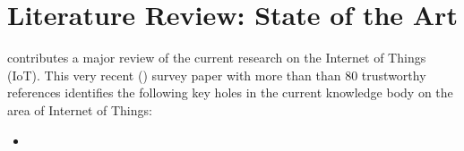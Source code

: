 \section{Literature Review: State of the Art}

\textcite{xu-he-li:internet-of-things-in-industries-a-survery:2014} contributes a major review of the current research on the Internet of Things (IoT). This very recent (\citeyear{xu-he-li:internet-of-things-in-industries-a-survery:2014}) survey paper with more than than 80 trustworthy references identifies the following key holes in the current knowledge body on the area of Internet of Things:

\begin{itemize}
  \item 
\end{itemize}
